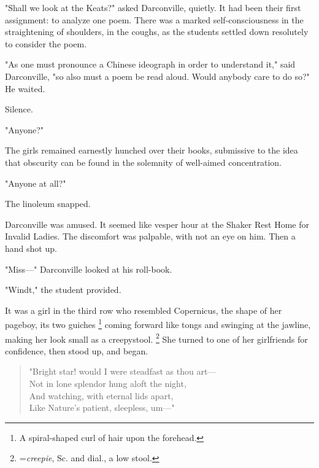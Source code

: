   "Shall we look at the Keats?" asked Darconville, quietly. It had been their
first assignment: to analyze one poem. There was a marked self-consciousness in
the straightening of shoulders, in the coughs, as the students settled down
resolutely to consider the poem.

  "As one must pronounce a Chinese ideograph in order to understand it," said
Darconville, "so also must a poem be read aloud. Would anybody care to do so?"
He waited.

  Silence.

  "Anyone?"

  The girls remained earnestly hunched over their books, submissive to the idea
that obscurity can be found in the solemnity of well-aimed concentration.

  "Anyone at all?"

  The linoleum snapped.

  Darconville was amused. It seemed like vesper 
hour at the Shaker Rest Home for Invalid Ladies. The discomfort was palpable, 
with not an eye on him. Then a hand shot up.

  "Miss---" Darconville looked at his roll-book.

  "Windt," the student provided.

  It was a girl in the third row who resembled Copernicus, the shape of her
pageboy, 
its two guiches 
\footnote{ A spiral-shaped curl of hair upon the forehead.}
coming forward like tongs 
and swinging at the jawline, making her look small as a creepystool. 
\footnote{=\textit{creepie}, Sc. and dial., a low stool. }
She turned to one of her girlfriends for confidence, then stood up, and began.
 
\begin{verse}
        "Bright star! would I were steadfast as thou art---  \\
        Not in lone splendor hung aloft the night,  \\
        And watching, with eternal lids apart, \\
        Like Nature's patient, sleepless, um---"
\end{verse}
 
